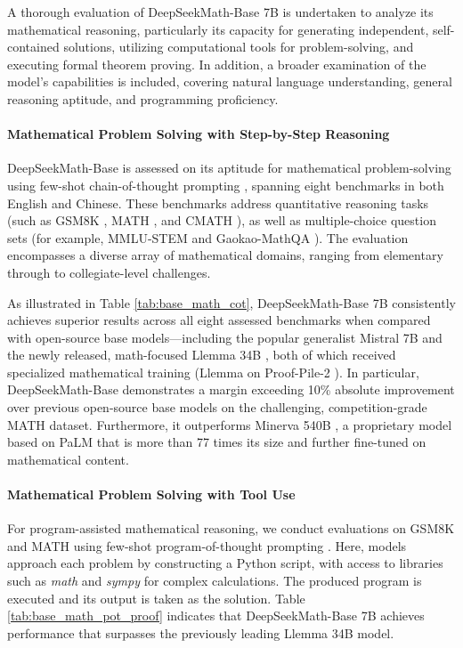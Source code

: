 \begin{itemize}[topsep=0pt]
A thorough evaluation of DeepSeekMath-Base 7B is undertaken to analyze its mathematical reasoning, particularly its capacity for generating independent, self-contained solutions, utilizing computational tools for problem-solving, and executing formal theorem proving. In addition, a broader examination of the model's capabilities is included, covering natural language understanding, general reasoning aptitude, and programming proficiency.

\paragraph{Mathematical Problem Solving with Step-by-Step Reasoning}

DeepSeekMath-Base is assessed on its aptitude for mathematical problem-solving using few-shot chain-of-thought prompting \citep{cot}, spanning eight benchmarks in both English and Chinese. These benchmarks address quantitative reasoning tasks (such as GSM8K \citep{gsm8k}, MATH \citep{MATH}, and CMATH \citep{wei2023cmath}), as well as multiple-choice question sets (for example, MMLU-STEM \citep{mmlu} and Gaokao-MathQA \citep{agieval}). The evaluation encompasses a diverse array of mathematical domains, ranging from elementary through to collegiate-level challenges.

As illustrated in Table \ref{tab:base_math_cot}, DeepSeekMath-Base 7B consistently achieves superior results across all eight assessed benchmarks when compared with open-source base models—including the popular generalist Mistral 7B \citep{mistral} and the newly released, math-focused Llemma 34B \citep{llemma}, both of which received specialized mathematical training (Llemma on Proof-Pile-2 \citep{llemma}). In particular, DeepSeekMath-Base demonstrates a margin exceeding 10\% absolute improvement over previous open-source base models on the challenging, competition-grade MATH dataset. Furthermore, it outperforms Minerva 540B \citep{minerva}, a proprietary model based on PaLM \citep{palm} that is more than 77 times its size and further fine-tuned on mathematical content.

\paragraph{Mathematical Problem Solving with Tool Use} For program-assisted mathematical reasoning, we conduct evaluations on GSM8K and MATH using few-shot program-of-thought prompting \citep{pot,pal}. Here, models approach each problem by constructing a Python script, with access to libraries such as \textit{math} and \textit{sympy} for complex calculations. The produced program is executed and its output is taken as the solution. Table \ref{tab:base_math_pot_proof} indicates that DeepSeekMath-Base 7B achieves performance that surpasses the previously leading Llemma 34B model.


\end{itemize}
